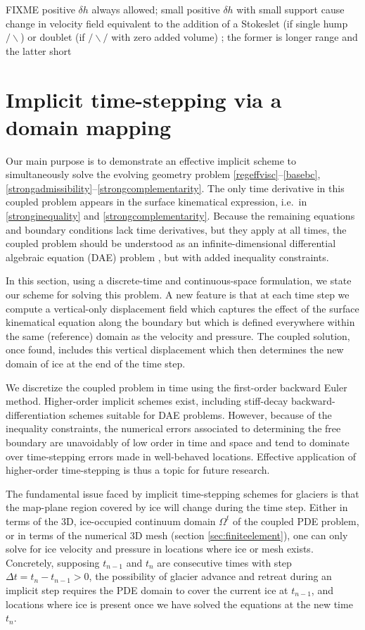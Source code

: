 \documentclass[letterpaper,final,12pt,reqno]{amsart}
\begin{document}
FIXME positive $\delta h$ always allowed; small positive $\delta h$ with small support cause change in velocity field equivalent to the addition of a Stokeslet (if single hump $/\backslash$) or doublet (if $/\backslash/$ with zero added volume) \cite{ChwangWu1975}; the former is longer range and the latter short


\section{Implicit time-stepping via a domain mapping} \label{sec:implicitstep}

Our main purpose is to demonstrate an effective implicit scheme to simultaneously solve the evolving geometry problem \eqref{regeffvisc}--\eqref{basebc}, \eqref{strongadmissibility}--\eqref{strongcomplementarity}.  The only time derivative in this coupled problem appears in the surface kinematical expression, i.e.~in \eqref{stronginequality} and \eqref{strongcomplementarity}.  Because the remaining equations and boundary conditions lack time derivatives, but they apply at all times, the coupled problem should be understood as an infinite-dimensional differential algebraic equation (DAE) problem \cite{AscherPetzold1998}, but with added inequality constraints.

In this section, using a discrete-time and continuous-space formulation, we state our scheme for solving this problem.  A new feature is that at each time step we compute a vertical-only displacement field which captures the effect of the surface kinematical equation along the boundary but which is defined everywhere within the same (reference) domain as the velocity and pressure.  The coupled solution, once found, includes this vertical displacement which then determines the new domain of ice at the end of the time step.

We discretize the coupled problem in time using the first-order backward Euler method.  Higher-order implicit schemes exist, including stiff-decay backward-differentiation schemes \cite{AscherPetzold1998,Bueler2021} suitable for DAE problems.  However, because of the inequality constraints, the numerical errors associated to determining the free boundary are unavoidably of low order in time and space \cite{Bueler2020} and tend to dominate over time-stepping errors made in well-behaved locations.  Effective application of higher-order time-stepping is thus a topic for future research.

The fundamental issue faced by implicit time-stepping schemes for glaciers is that the map-plane region covered by ice will change during the time step.  Either in terms of the 3D, ice-occupied continuum domain $\Omega^t$ of the coupled PDE problem, or in terms of the numerical 3D mesh (section \ref{sec:finiteelement}), one can only solve for ice velocity and pressure in locations where ice or mesh exists.  Concretely, supposing $t_{n-1}$ and $t_n$ are consecutive times with step $\Delta t = t_n - t_{n-1} > 0$, the possibility of glacier advance and retreat during an implicit step requires the PDE domain to cover the current ice at $t_{n-1}$, and locations where ice is present once we have solved the equations at the new time $t_n$.
\end{document}
